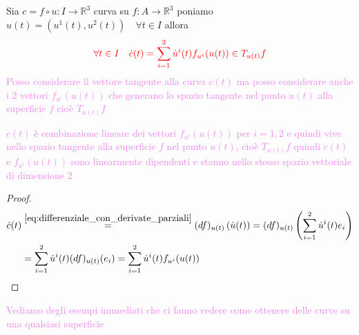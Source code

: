         \begin{proposizione}
        \mbox{}

        Sia $c = f \circ u \colon I \to \mathbb{R}^3$ curva su $f \colon A \to \mathbb{R}^3$ poniamo
        $u(t)=(u^1(t),u^2(t)) \quad \forall t \in I$ allora
        \begin{equation} 
        \label{eq:derivazione_curva_su_una_superficie}
        \color{red} \forall t \in I \quad \dot{c}(t)= \sum_{i=1}^2 \dot{u}^i(t) f_{u^i}(u(t)) \in T_{u(t)} f
        \end{equation}
        \textcolor{violet}{Posso considerare il vettore tangente alla curva $\dot{c}(t)$ ma posso considerare anche 
        i $2$ vettori $f_{u^i}(u(t))$ che generano lo spazio tangente nel punto $u(t)$ alla superficie $f$ cioè $T_{u(t)}f$}

        \textcolor{violet}{$\dot{c}(t)$ è combinazione lineare dei vettori $f_{u^i}(u(t))$ per $i=1,2$ e quindi vive nello
        spazio tangente alla superficie $f$ nel punto $u(t)$, cioè $T_{u(t)}f$ quindi $\dot{c}(t)$ e $f_{u^i}(u(t))$ 
        sono linearmente dipendenti e stanno nello stesso spazio vettoriale di dimensione $2$}
        \end{proposizione}
        \begin{proof}
        \mbox{}

        \begin{align*}
        \dot{c}(t) &\overset{\eqref{eq:differenziale_con_derivate_parziali}}{=} (df)_{u(t)} \left(\dot{u} (t)\right) = (df)_{u(t)} \left(\sum_{i=1}^2 \dot{u}^i (t) e_i\right) \\
        &=\sum_{i=1}^2 \dot{u}^i (t) (df)_{u(t)} (e_i) = \sum_{i=1}^2 \dot{u}^i(t) f_{u^i}(u(t))
        \end{align*}
        \end{proof}
        \newpage
        \textcolor{violet}{Vediamo degli esempi immediati che ci fanno vedere come 
        ottenere delle curve su una qualsiasi superficie}
